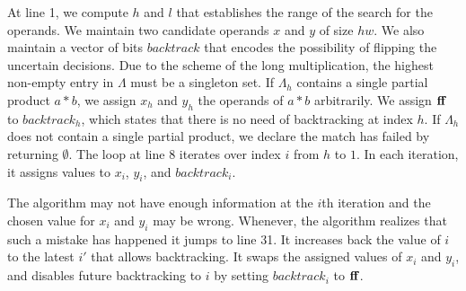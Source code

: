 At line 1, we compute $h$ and $l$ that establishes the range of the
search for the operands.
%
We maintain two candidate operands $x$ and $y$ of size $hw$.
%
We also maintain a vector of bits $backtrack$ that encodes 
the possibility of flipping the uncertain decisions.
%
Due to the scheme of the long multiplication, the highest
non-empty entry in $\Lambda$ must be a singleton set.
%
If $\Lambda_h$ contains a single partial product $a*b$,
we assign $x_h$ and $y_h$ the operands of $a*b$ arbitrarily.
%
We assign $\mathbf{ff}$ to $backtrack_h$, which states that
there is no need of backtracking at index $h$.
%
If $\Lambda_h$ does not contain a single partial product,
we declare the match has failed by returning $\emptyset$.
%
The loop at line 8 iterates over index $i$ from $h$ to $1$.
%
In each iteration, it assigns values to $x_i$, $y_i$, and $backtrack_i$. 
%

The algorithm may not have enough information at the $i$th iteration
and the chosen value for $x_i$ and $y_i$ may be wrong.
%
Whenever, the algorithm realizes that such a mistake has happened
it jumps to line 31.
%
It increases back the value of $i$ to the latest $i'$ that allows
backtracking.
%
It swaps the assigned values of $x_i$ and $y_i$, and disables future
backtracking to $i$ by setting $backtrack_i$ to
$\mathbf{ff}$.
%

